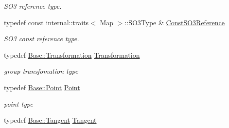 \begin{DoxyCompactItemize}
\begin{DoxyCompactList}\small\item\em S\+O3 reference type. \end{DoxyCompactList}\item 
typedef const internal\+::traits$<$ Map $>$\+::S\+O3\+Type \& \hyperlink{class_eigen_1_1_map_3_01_sophus_1_1_s_e3_group_3_01___scalar_01_4_00_01___options_01_4_ae5d42a314a260ccc1240218a47b99f94}{Const\+S\+O3\+Reference}\hypertarget{class_eigen_1_1_map_3_01_sophus_1_1_s_e3_group_3_01___scalar_01_4_00_01___options_01_4_ae5d42a314a260ccc1240218a47b99f94}{}\label{class_eigen_1_1_map_3_01_sophus_1_1_s_e3_group_3_01___scalar_01_4_00_01___options_01_4_ae5d42a314a260ccc1240218a47b99f94}

\begin{DoxyCompactList}\small\item\em S\+O3 const reference type. \end{DoxyCompactList}\item 
typedef \hyperlink{class_sophus_1_1_s_e3_group_base_a426ebd53f324a4fd6d36c28028f967f1}{Base\+::\+Transformation} \hyperlink{class_eigen_1_1_map_3_01_sophus_1_1_s_e3_group_3_01___scalar_01_4_00_01___options_01_4_a3554c03dc5a569a9c8af6068f427af46}{Transformation}\hypertarget{class_eigen_1_1_map_3_01_sophus_1_1_s_e3_group_3_01___scalar_01_4_00_01___options_01_4_a3554c03dc5a569a9c8af6068f427af46}{}\label{class_eigen_1_1_map_3_01_sophus_1_1_s_e3_group_3_01___scalar_01_4_00_01___options_01_4_a3554c03dc5a569a9c8af6068f427af46}

\begin{DoxyCompactList}\small\item\em group transfomation type \end{DoxyCompactList}\item 
typedef \hyperlink{class_sophus_1_1_s_e3_group_base_aca2cf20e857567b74fb399c7ee76c744}{Base\+::\+Point} \hyperlink{class_eigen_1_1_map_3_01_sophus_1_1_s_e3_group_3_01___scalar_01_4_00_01___options_01_4_a7d268c6f8843b33556e7d34ee013862c}{Point}\hypertarget{class_eigen_1_1_map_3_01_sophus_1_1_s_e3_group_3_01___scalar_01_4_00_01___options_01_4_a7d268c6f8843b33556e7d34ee013862c}{}\label{class_eigen_1_1_map_3_01_sophus_1_1_s_e3_group_3_01___scalar_01_4_00_01___options_01_4_a7d268c6f8843b33556e7d34ee013862c}

\begin{DoxyCompactList}\small\item\em point type \end{DoxyCompactList}\item 
typedef \hyperlink{class_sophus_1_1_s_e3_group_base_a45f63b562f0614853cef2c04c4cd5f2b}{Base\+::\+Tangent} \hyperlink{class_eigen_1_1_map_3_01_sophus_1_1_s_e3_group_3_01___scalar_01_4_00_01___options_01_4_a8d68bc2d6d32babafa95546194c60301}{Tangent}\hypertarget{class_eigen_1_1_map_3_01_sophus_1_1_s_e3_group_3_01___scalar_01_4_00_01___options_01_4_a8d68bc2d6d32babafa95546194c60301}{}\label{class_eigen_1_1_map_3_01_sophus_1_1_s_e3_group_3_01___scalar_01_4_00_01___options_01_4_a8d68bc2d6d32babafa95546194c60301}


\end{DoxyCompactItemize}
